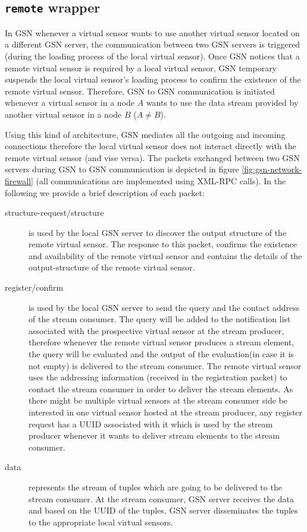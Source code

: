 \subsection{\texttt{remote} wrapper}

In GSN whenever a virtual sensor wants to use another virtual sensor located on a different GSN server, the 
communication between two GSN servers is triggered (during the loading process of the local virtual sensor).
Once GSN notices that a remote virtual sensor is required by 
a local virtual sensor, GSN temporary suspends the local virtual sensor's loading process to confirm the existence of the remote virtual
sensor. Therefore, GSN to GSN communication is initiated whenever a virtual sensor in a node $A$ wants to use the data stream
provided by another virtual sensor in a node $B$ ($A \neq B$).

Using this kind of architecture, GSN mediates all the outgoing and incoming connections therefore the local virtual sensor
does not interact directly with the remote virtual sensor (and vise versa). The packets exchanged between
two GSN servers during GSN to GSN communication is depicted in figure \ref{fig:gsn-network-firewall} (all communications
are implemented using XML-RPC calls). In the following we provide a brief description of each packet:
\begin{description}
	\item[structure-request/structure] is used by the local GSN server to discover the output structure of the remote virtual sensor. The response
	to this packet, confirms the existence and availability of the remote virtual sensor and contains the details of the  output-structure of the remote virtual
	sensor.	
	\item[register/confirm] is used by the local GSN server to send the query and the contact address of the stream consumer. The query will be added to the notification
	list associated with the prospective virtual sensor at the stream producer, therefore whenever the remote virtual sensor produces a stream element, the query
	will be evaluated and the output of the evaluation(in case it is not empty) is delivered to the stream consumer.
	The remote virtual sensor uses the addressing information (received in the registration packet) to contact the stream consumer in order to
	deliver the stream elements. As there might be multiple virtual sensors at the stream consumer side be interested in one virtual sensor hosted
	at the stream producer, any register request has a UUID associated with it which is used by the stream producer whenever it wants to deliver stream elements 
	to the stream consumer.
	\item[data] represents the stream of tuples which are going to be delivered to the stream consumer. At the stream consumer, GSN server receives the data and based
	on the UUID of the tuples, GSN server disseminates the tuples to the appropriate local virtual sensors.
\end{description}

